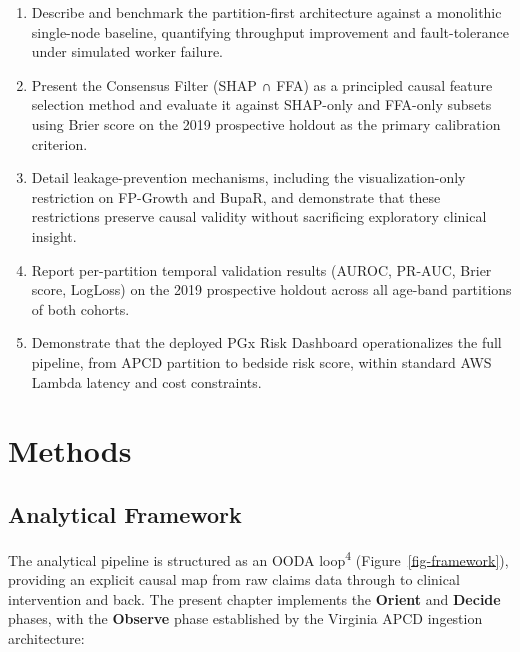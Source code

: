 \documentclass[
  12pt,
]{book}
\providecommand{\tightlist}{%
  \setlength{\itemsep}{0pt}\setlength{\parskip}{0pt}}
\begin{document}
\begin{enumerate}
\def\labelenumi{\arabic{enumi}.}
\tightlist
\item
  Describe and benchmark the partition-first architecture against a
  monolithic single-node baseline, quantifying throughput improvement
  and fault-tolerance under simulated worker failure.
\item
  Present the Consensus Filter (SHAP ∩ FFA) as a principled causal
  feature selection method and evaluate it against SHAP-only and
  FFA-only subsets using Brier score on the 2019 prospective holdout as
  the primary calibration criterion.
\item
  Detail leakage-prevention mechanisms, including the visualization-only
  restriction on FP-Growth and BupaR, and demonstrate that these
  restrictions preserve causal validity without sacrificing exploratory
  clinical insight.
\item
  Report per-partition temporal validation results (AUROC, PR-AUC, Brier
  score, LogLoss) on the 2019 prospective holdout across all age-band
  partitions of both cohorts.
\item
  Demonstrate that the deployed PGx Risk Dashboard operationalizes the
  full pipeline, from APCD partition to bedside risk score, within
  standard AWS Lambda latency and cost constraints.
\end{enumerate}

\chapter{Methods}\label{sec-methods}

\section{Analytical Framework}\label{analytical-framework}

The analytical pipeline is structured as an OODA loop\textsuperscript{4}
(Figure~\ref{fig-framework}), providing an explicit causal map from raw
claims data through to clinical intervention and back. The present
chapter implements the \textbf{Orient} and \textbf{Decide} phases, with
the \textbf{Observe} phase established by the Virginia APCD ingestion
architecture:
\end{document}
